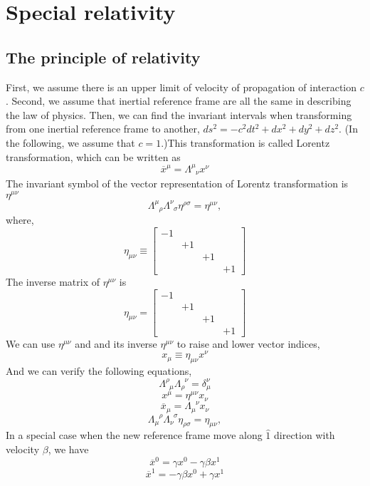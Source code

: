 \documentclass[cyan]{elegantnote}
\author{Yuyang Songsheng}
\begin{document}
\maketitle
\tableofcontents
\chapter{Special relativity}
\section{The principle of relativity}
First, we assume there is an upper limit of velocity of propagation of interaction $c$. Second, we assume that inertial reference frame are all the same in describing the law of physics. Then, we can find the invariant intervals when transforming from one inertial reference frame to another, $ds^2 = -c^2 dt^2 + dx^2 + dy^2 + dz^2$. 
(In the following, we assume that $c=1$.)This transformation is called Lorentz transformation, which can be written as
\[\overline{x}^{\mu} = \Lambda^{\mu}_{\phantom{\mu}\nu} x^{\nu}\]
The invariant symbol of the vector representation of Lorentz transformation is $\eta^{\mu \nu}$
\[\Lambda^{\mu}_{\phantom{\mu}\rho}  \Lambda^{\nu}_{\phantom{\nu}\sigma}  \eta^{\rho \sigma} = \eta^{\mu \nu},\]
where,
\[\eta_{\mu \nu} \equiv \left[ 
\begin{matrix} 
-1& & & \\ 
& +1 & & \\
& & +1 & \\
& & & +1
\end{matrix} 
\right]\]
The inverse matrix of $\eta^{\mu \nu}$ is
\[\eta_{\mu \nu} = \left[ 
\begin{matrix} 
-1& & & \\ 
& +1 & & \\
& & +1 & \\
& & & +1
\end{matrix} 
\right]\]
We can use $\eta^{\mu \nu}$ and and its inverse $\eta^{\mu \nu}$ to raise and lower vector indices, 
\[x_{\mu} \equiv \eta_{\mu \nu} x^{\nu}\]
And we can verify the following equations,
\[\Lambda^{\rho}_{\phantom{\rho}\mu} \Lambda_{\rho}^{\phantom{\rho}\nu} = \delta^{\nu}_{\mu} \]
\[x^{\mu} = \eta^{\mu \nu} x_{\nu}\]
\[\overline{x}_{\mu} = \Lambda_{\mu}^{\phantom{\mu}\nu} x_{\nu}\]
\[\Lambda_{\mu}^{\phantom{\mu}\rho}  \Lambda_{\nu}^{\phantom{\nu}\sigma}  \eta_{\rho \sigma} = \eta_{\mu \nu},\]
In a special case when the new reference frame move along $\hat{1}$ direction with velocity $\beta$, we have
\[\overline{x}^{0} = \gamma x^0 - \gamma \beta x^1\]
\[\overline{x}^{1} = -\gamma \beta x^0 + \gamma x^1\]
\end{document}
